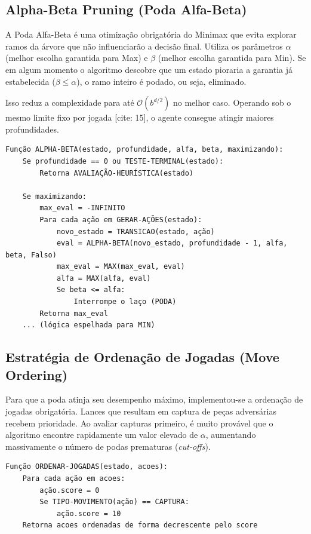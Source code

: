 \documentclass[12pt,a4paper]{article}
\begin{document}
\subsection{Alpha-Beta Pruning (Poda Alfa-Beta)}
A Poda Alfa-Beta é uma otimização obrigatória do Minimax que evita explorar ramos da árvore que não influenciarão 
a decisão final. Utiliza os parâmetros $\alpha$ (melhor escolha garantida para Max) e $\beta$ (melhor escolha garantida para Min).
Se em algum momento o algoritmo descobre que um estado pioraria a garantia já estabelecida ($\beta \leq \alpha$), 
o ramo inteiro é podado, ou seja, eliminado.

Isso reduz a complexidade para até $\mathcal{O}(b^{d/2})$ no melhor caso. 
Operando sob o mesmo limite fixo por jogada [cite: 15], o agente consegue atingir maiores profundidades.

\begin{verbatim}
Função ALPHA-BETA(estado, profundidade, alfa, beta, maximizando):
    Se profundidade == 0 ou TESTE-TERMINAL(estado):
        Retorna AVALIAÇÃO-HEURÍSTICA(estado)
        
    Se maximizando:
        max_eval = -INFINITO
        Para cada ação em GERAR-AÇÕES(estado):
            novo_estado = TRANSICAO(estado, ação)
            eval = ALPHA-BETA(novo_estado, profundidade - 1, alfa, beta, Falso)
            max_eval = MAX(max_eval, eval)
            alfa = MAX(alfa, eval)
            Se beta <= alfa:
                Interrompe o laço (PODA)
        Retorna max_eval
    ... (lógica espelhada para MIN)
\end{verbatim}

\subsection{Estratégia de Ordenação de Jogadas (Move Ordering)}
Para que a poda atinja seu desempenho máximo, implementou-se a ordenação de jogadas obrigatória. 
Lances que resultam em captura de peças adversárias recebem prioridade. Ao avaliar capturas primeiro, 
é muito provável que o algoritmo encontre rapidamente um valor elevado de $\alpha$, aumentando massivamente 
o número de podas prematuras (\textit{cut-offs}).

\begin{verbatim}
Função ORDENAR-JOGADAS(estado, acoes):
    Para cada ação em acoes:
        ação.score = 0
        Se TIPO-MOVIMENTO(ação) == CAPTURA:
            ação.score = 10
    Retorna acoes ordenadas de forma decrescente pelo score
\end{verbatim}
\end{document}
